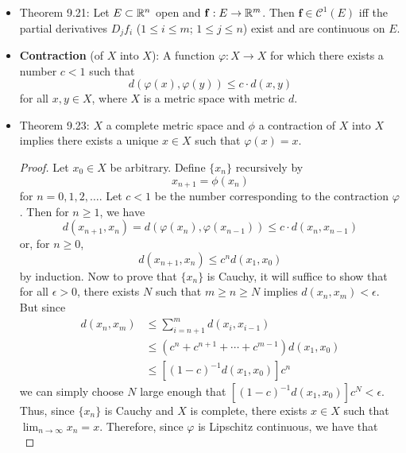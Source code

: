 \documentclass[../notes.tex]{subfiles}
\begin{document}
\begin{itemize}
    \item Theorem 9.21: Let $E\subset\mathbb{R}^n$ open and $\mathbf{f}:E\to\mathbb{R}^m$. Then $\mathbf{f}\in\mathscr{C}^1(E)$ iff the partial derivatives $D_jf_i$ ($1\leq i\leq m$; $1\leq j\leq n$) exist and are continuous on $E$.
    \item {}\textbf{Contraction} (of $X$ into $X$): A function $\varphi:X\to X$ for which there exists a number $c<1$ such that
    \begin{equation*}
        d(\varphi(x),\varphi(y)) \leq c\cdot d(x,y)
    \end{equation*}
    for all $x,y\in X$, where $X$ is a metric space with metric $d$.
    \item Theorem 9.23: $X$ a complete metric space and $\phi$ a contraction of $X$ into $X$ implies there exists a unique $x\in X$ such that $\varphi(x)=x$.
    \begin{proof}
        Let $x_0\in X$ be arbitrary. Define $\{x_n\}$ recursively by
        \begin{equation*}
            x_{n+1} = \phi(x_n)
        \end{equation*}
        for $n=0,1,2,\dots$. Let $c<1$ be the number corresponding to the contraction $\varphi$. Then for $n\geq 1$, we have
        \begin{equation*}
            d(x_{n+1},x_n) = d(\varphi(x_n),\varphi(x_{n-1})) \leq c\cdot d(x_n,x_{n-1})
        \end{equation*}
        or, for $n\geq 0$,
        \begin{equation*}
            d(x_{n+1},x_n) \leq c^nd(x_1,x_0)
        \end{equation*}
        by induction. Now to prove that $\{x_n\}$ is Cauchy, it will suffice to show that for all $\epsilon>0$, there exists $N$ such that $m\geq n\geq N$ implies $d(x_n,x_m)<\epsilon$. But since
        \begin{align*}
            d(x_n,x_m) &\leq \sum_{i=n+1}^md(x_i,x_{i-1})\\
            &\leq (c^n+c^{n+1}+\cdots+c^{m-1})d(x_1,x_0)\\
            &\leq [(1-c)^{-1}d(x_1,x_0)]c^n
        \end{align*}
        we can simply choose $N$ large enough that $[(1-c)^{-1}d(x_1,x_0)]c^N<\epsilon$. Thus, since $\{x_n\}$ is Cauchy and $X$ is complete, there exists $x\in X$ such that $\lim_{n\to\infty}x_n=x$. Therefore, since $\varphi$ is Lipschitz continuous, we have that
        \begin{equation*}

\end{equation*}
\end{proof}
\end{itemize}
\end{document}
